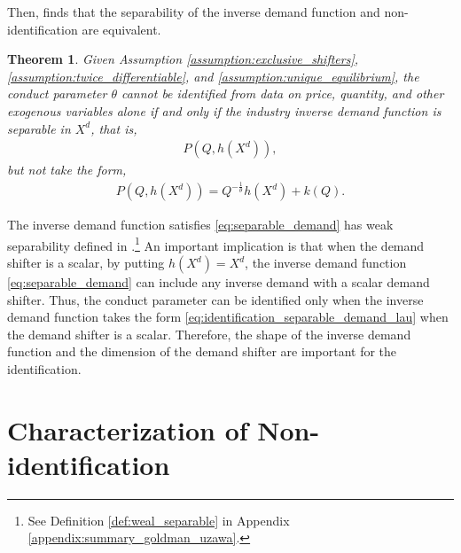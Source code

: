 \documentclass[11pt, a4paper]{article}
\newtheorem{theorem}{Theorem}
\theoremstyle{remark}
\begin{document}
Then, \citet{lau1982identifying} finds that the separability of the inverse demand function and non-identification are equivalent.
\begin{theorem}\label{theorem_lau}
    Given Assumption \ref{assumption:exclusive_shifters}, \ref{assumption:twice_differentiable}, and \ref{assumption:unique_equilibrium},
    the conduct parameter $\theta$ cannot be identified from data on price, quantity, and other exogenous variables alone if and only if the industry inverse demand function is separable in $X^{d}$, that is,
    \begin{align}
        P(Q, h(X^{d})), \label{eq:separable_demand}
    \end{align}
    but not take the form, 
    \begin{align}
        P(Q, h(X^{d})) = Q^{-\frac{1}{\theta}}h(X^{d}) + k(Q). \label{eq:identification_separable_demand_lau}
    \end{align}
\end{theorem}
The inverse demand function satisfies \eqref{eq:separable_demand} has weak separability defined in \citet{goldmanNote1964}.\footnote{See Definition \ref{def:weal_separable} in Appendix \ref{appendix:summary_goldman_uzawa}.}
An important implication is that when the demand shifter is a scalar, by putting $h(X^{d})= X^{d}$, the inverse demand function \eqref{eq:separable_demand} can include any inverse demand with a scalar demand shifter.
Thus, the conduct parameter can be identified only when the inverse demand function takes the form \eqref{eq:identification_separable_demand_lau} when the demand shifter is a scalar.
Therefore, the shape of the inverse demand function and the dimension of the demand shifter are important for the identification.




\section{Characterization of Non-identification}\label{sec:non-identification_characterization}
\end{document}
